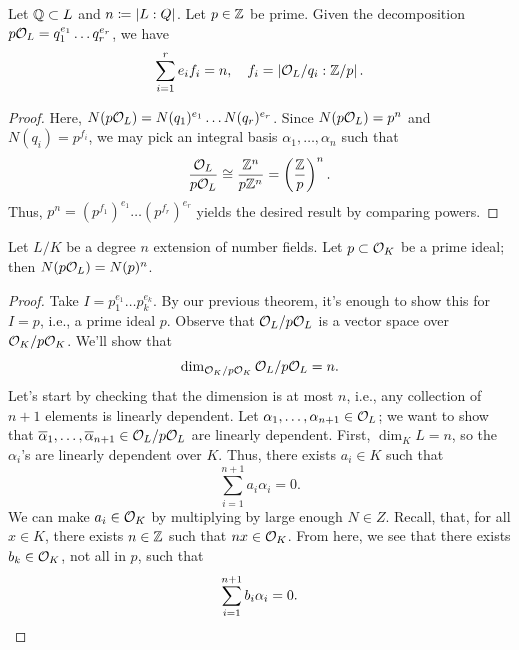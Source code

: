 \begin{theorem} \label{thm:ramification_and_inertia_over_Z}
    Let $\mathbb Q \subset L$ and $n \coloneq \left\lvert L:Q \right\rvert$. Let $p \in \mathbb Z$ be prime. Given the decomposition $p \mathcal O_L = q_1^{e_1} \dots q_r^{e_r}$, we have
    \[ \sum_{i=1}^r e_i f_i = n, \quad f_i = \left\lvert \mathcal O_L/q_i : \mathbb Z/p \right\rvert. \]
\end{theorem}

\newpage
\begin{proof}
    Here, $N(p \mathcal O_L) = N(q_1)^{e_1} \dots N(q_r)^{e_r}$. Since $N(p \mathcal O_L) = p^n$ and $N(q_i) = p^{f_i}$, we may pick an integral basis $\alpha_1, \dots, \alpha_n$ such that
    \[ \frac{\mathcal O_L}{p \mathcal O_L} \cong \frac{\mathbb Z^n}{p \mathbb Z^n} = \left(\frac{\mathbb Z}{p}\right)^n. \]
    Thus, $p^n = (p^{f_1})^{e_1} \dots (p^{f_r})^{e_r}$ yields the desired result by comparing powers.
\end{proof}

\begin{theorem} \label{thm:norms_in_number_field_extension}
    Let $L/K$ be a degree $n$ extension of number fields. Let $p \subset \mathcal O_K$ be a prime ideal; then $N(p \mathcal O_L) = N(p)^n$.
\end{theorem}
\begin{proof} \renewcommand{\qedsymbol}{\ensuremath{\triangle}}
    Take $I = p_1^{e_1} \dots p_k^{e_k}$. By our previous theorem, it's enough to show this for $I = p$, i.e., a prime ideal $p$. Observe that $\mathcal O_L / p \mathcal O_L$ is a vector space over $\mathcal O_K / p \mathcal O_K$. We'll show that
    \[ \dim_{\mathcal O_K / p \mathcal O_K} \mathcal O_L / p \mathcal O_L = n. \]
    Let's start by checking that the dimension is at most $n$, i.e., any collection of $n + 1$ elements is linearly dependent. Let $\alpha_1, \dots, \alpha_{n+1} \in \mathcal O_L$; we want to show that $\overline \alpha_1, \dots, \overline \alpha_{n+1} \in \mathcal O_L/p \mathcal O_L$ are linearly dependent. First, $\dim_K L = n$, so the $\alpha_i$'s are linearly dependent over $K$. Thus, there exists $a_i \in K$ such that
    \[ \sum_{i=1}^{n+1} a_i \alpha_i = 0. \]
    We can make $a_i \in \mathcal O_K$ by multiplying by large enough $N \in Z$. Recall, that, for all $x \in K$, there exists $n \in \mathbb Z$ such that $nx \in \mathcal O_K$. From here, we see that there exists $b_k \in \mathcal O_K$, not all in $p$, such that 
    \[ \sum_{i=1}^{n+1} b_i \alpha_i = 0. \qedhere \]
\end{proof}

